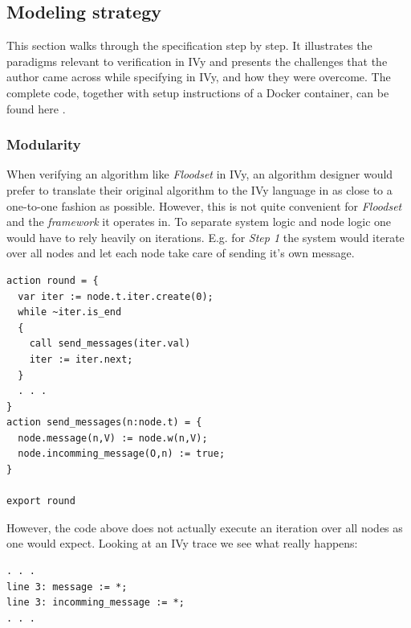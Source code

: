 \documentclass[fleqn]{article}
\begin{document}
\subsection{Modeling strategy}

This section walks through the specification step by step. It illustrates the paradigms relevant to verification in IVy and presents the challenges that the author came across while specifying in IVy, and how they were overcome. The complete code, together with setup instructions of a Docker container, can be found here \cite{github}.

\subsubsection{Modularity}
When verifying an algorithm like \textit{Floodset} in IVy, an algorithm designer would prefer to translate their original algorithm to the IVy language in as close to a one-to-one fashion as possible. However, this is not quite convenient for \textit{Floodset} and the \textit{framework} it operates in.
To separate system logic and node logic one would have to rely heavily on iterations. E.g. for \textit{Step 1} the system would iterate over all nodes and let each node take care of sending it's own message.

\begin{mdframed}[nobreak=true, backgroundcolor=light-gray, roundcorner=10pt,leftmargin=1, rightmargin=1, innerleftmargin=15, innertopmargin=15,innerbottommargin=15, outerlinewidth=1, linecolor=light-gray]
\begin{lstlisting}
action round = {
  var iter := node.t.iter.create(0);
  while ~iter.is_end
  {
    call send_messages(iter.val)
    iter := iter.next;
  }
  . . .
}
action send_messages(n:node.t) = {
  node.message(n,V) := node.w(n,V);
  node.incomming_message(O,n) := true;
}

export round
\end{lstlisting}
\end{mdframed}

\noindent However, the code above does not actually execute an iteration over all nodes as one would expect. Looking at an IVy trace we see what really happens:

\begin{mdframed}[nobreak=true, backgroundcolor=light-gray, roundcorner=10pt,leftmargin=1, rightmargin=1, innerleftmargin=15, innertopmargin=15,innerbottommargin=15, outerlinewidth=1, linecolor=light-gray]
\begin{lstlisting}
. . .
line 3: message := *;
line 3: incomming_message := *;
. . .
\end{lstlisting}
\end{mdframed}
\end{document}
